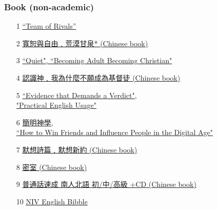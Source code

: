 \documentclass[t]{beamer}
\newcommand{\hlink}[2]{\hyperlink{#1}{#2}}
\begin{document}
\begin{frame}[allowframebreaks]
\frametitle{Book (non-academic)}
\begin{enumerate}
\item[1] \hlink{lincoln}{``Team of Rivals''}
\item[2] \hlink{forgive}{寬恕與自由﹑荒漠甘泉* (Chinese book)}
\item[3] \hlink{quiet}{``Quiet", ``Becoming Adult Becoming Christian"}
\item[4] \hlink{know}{認識神﹑我為什麼不願成為基督徒 (Chinese book)}
\item[5] \hlink{evidence}{``Evidence that Demands a Verdict",\\"Practical English Usage"}
\item[6] \hlink{win}{簡明神學,\\``How to Win Friends and Influence People in the Digital Age"}
\item[7] \hlink{psalm}{默想詩篇﹑默想新約 (Chinese book)}
\item[8] \hlink{hide}{密室 (Chinese book)}
\item[9] \hlink{putonghua}{普通話速成 南人北語 初/中/高級 +CD (Chinese book)}
\item[10] \hlink{NIV}{NIV English Bibble}
\end{enumerate}
\end{frame}
\end{document}
